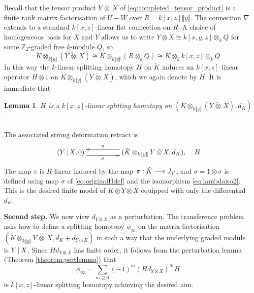 \documentclass[english,letter paper,12pt,leqno]{article}
\newtheorem{lemma}[theorem]{Lemma}
\theoremstyle{example}
\numberwithin{equation}{section}
\begin{document}
Recall that the tensor product $Y \,\check{\otimes}\, X$ of \eqref{eq:completed_tensor_product} is a finite rank matrix factorisation of $U - W$ over $R = k[x,z]\llbracket y \rrbracket$. The connection $\nabla$ extends to a standard $k[x,z]$-linear flat connection on $R$. A choice of homogeneous basis for $X$ and $Y$ allows us to write $Y \otimes X \cong k[x,y,z] \otimes_k Q$ for some $\mathbb{Z}_2$-graded free $k$-module $Q$, so
\begin{equation}\label{eq:lambdaiso2}
\check{K} \otimes_{k\llbracket y \rrbracket}( Y \,\check{\otimes}\, X ) \cong \check{K} \otimes_{k\llbracket y \rrbracket} (R \otimes_k Q) \cong \check{K} \otimes_k k[x,z] \otimes_k Q
\end{equation}
In this way the $k$-linear splitting homotopy $H$ on $\check{K}$ induces an $k[x,z]$-linear operator $H \otimes 1$ on $\check{K} \otimes_{k\llbracket y \rrbracket}( Y \,\check{\otimes}\, X)$, which we again denote by $H$. It is immediate that

\begin{lemma} $H$ is a $k[x,z]$-linear splitting homotopy on $(\check{K} \otimes_{k\llbracket y \rrbracket} ( Y \,\check{\otimes}\, X ), d_K)$.
\end{lemma}

The associated strong deformation retract is
\[
\xymatrix@C+2pc{
(Y \l X,0) \ar@<-1ex>[r]_-{\sigma} & (\check{K} \otimes_{k\llbracket y \rrbracket} Y \,\check{\otimes}\, X, d_K), \ar@<-1ex>[l]_-{\pi}
} \quad H
\]
The map $\pi$ is $R$-linear induced by the map $\pi: \check{K} \longrightarrow J_V$, and $\sigma = 1 \otimes \sigma$ is defined using map $\sigma$ of \eqref{eq:originalHdef} and the isomorphism \eqref{eq:lambdaiso2}. This is the desired finite model of $K \otimes Y \otimes X$ equipped with only the differential $d_K$. 

\vspace{0.3cm}

\textbf{Second step.} We now view $d_{Y \otimes X}$ as a perturbation. The transference problem asks how to define a splitting homotopy $\phi_\infty$ on the matrix factorisation $(\check{K} \otimes_{k\llbracket y \rrbracket} Y \,\check{\otimes}\, X , d_K + d_{Y \otimes X})$ in such a way that the underlying graded module is $Y \,|\, X$. Since $H d_{Y \otimes X}$ has finite order, it follows from the perturbation lemma (Theorem \ref{theorem:pertlemma}) that
\[
\phi_\infty = \sum_{m \ge 0} (-1)^m (H d_{Y \otimes X})^m H
\]
is $k[x,z]$-linear splitting homotopy achieving the desired aim.
\end{document}

